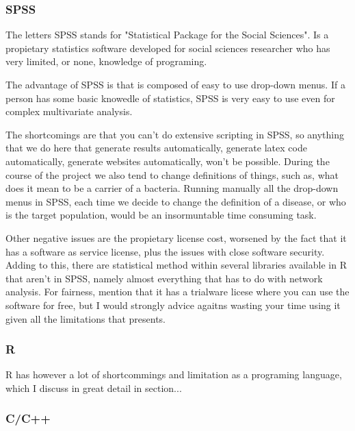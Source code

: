 \subsubsection{SPSS}

The letters SPSS \cite{ref:spss} stands for "Statistical Package for the Social Sciences". Is a propietary statistics software developed for social sciences researcher who has very limited, or none, knowledge of programing.\vspace{3 mm}

The advantage of SPSS is that is composed of easy to use drop-down menus. If a person has some basic knowedle of statistics, SPSS is very easy to use even for complex multivariate analysis.\vspace{3 mm}

The shortcomings are that you can't do extensive scripting in SPSS, so anything that we do here that generate results automatically, generate latex code automatically, generate websites automatically, won't be possible. During the course of the project we also tend to change definitions of things, such as, what does it mean to be a carrier of a bacteria. Running manually all the drop-down menus in SPSS, each time we decide to change the definition of a disease, or who is the target population, would be an insormuntable time consuming task.\vspace{3 mm}

Other negative issues are the propietary license cost, worsened by the fact that it has a software as service license, plus the issues with close software security. Adding to this, there are statistical method within several libraries available in R that aren't in SPSS, namely almost everything that has to do with network analysis. For fairness, mention that it has a trialware licese where you can use the software for free, but I would strongly advice agaitns wasting your time using it given all the limitations that presents.\vspace{3 mm}

\subsubsection{R}

R has however a lot of shortcommings and limitation as a programing language, which I discuss in great detail in section... \vspace{3 mm}

\subsubsection{C/C++}

